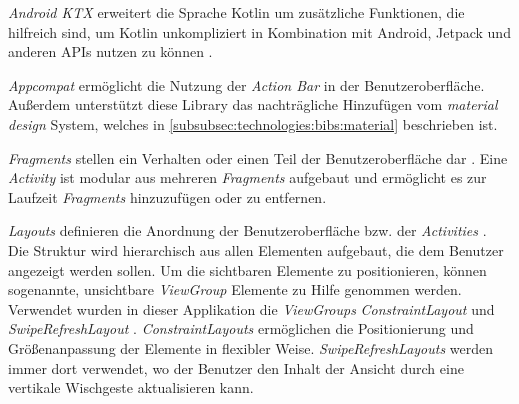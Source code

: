 \documentclass[a4paper]{article}
\begin{document}
\textit{Android KTX} erweitert die Sprache Kotlin um zusätzliche Funktionen, die hilfreich sind, um Kotlin unkompliziert in Kombination mit Android, Jetpack und anderen APIs nutzen zu können \autocite{android_ktx}.

\textit{Appcompat} \autocite{android_appcompat} ermöglicht die Nutzung der \textit{Action Bar} \autocite{android_action_bar} in der Benutzeroberfläche. Außerdem unterstützt diese Library das nachträgliche Hinzufügen vom \textit{material design} System, welches in \autoref{subsubsec:technologies:bibs:material} beschrieben ist.

\textit{Fragments} stellen ein Verhalten oder einen Teil der Benutzeroberfläche dar \autocite{android_fragments}. Eine \textit{Activity} ist modular aus mehreren \textit{Fragments} aufgebaut und ermöglicht es zur Laufzeit \textit{Fragments} hinzuzufügen oder zu entfernen.

\textit{Layouts} definieren die Anordnung der Benutzeroberfläche bzw. der \textit{Activities} \autocite{android_layouts}. Die Struktur wird hierarchisch aus allen Elementen aufgebaut, die dem Benutzer angezeigt werden sollen. Um die sichtbaren Elemente zu positionieren, können sogenannte, unsichtbare \textit{ViewGroup} Elemente zu Hilfe genommen werden. Verwendet wurden in dieser Applikation die \textit{ViewGroups} \textit{ConstraintLayout} \autocite{android_constraintlayout} und \textit{SwipeRefreshLayout} \autocite{android_swiperefreshlayout}. \textit{ConstraintLayouts} ermöglichen die Positionierung und Größenanpassung der Elemente in flexibler Weise. \textit{SwipeRefreshLayouts} werden immer dort verwendet, wo der Benutzer den Inhalt der Ansicht durch eine vertikale Wischgeste aktualisieren kann.
\end{document}
